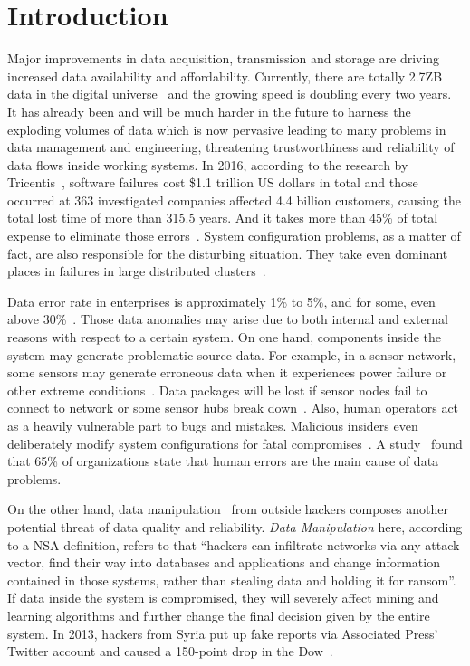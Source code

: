 \documentclass[10pt,conference,letterpaper]{IEEEtran}
\begin{document}
	\section{Introduction}
		Major improvements in data acquisition, transmission and storage are driving increased data availability and affordability. Currently, there are totally 2.7ZB data in the digital universe~\cite{bigDataStatistics} and the growing speed is doubling every two years.
		It has already been and will be much harder in the future to harness the exploding volumes of data which is now pervasive leading to many problems in data management and engineering, threatening trustworthiness and reliability of data flows inside working systems.
		In 2016, according to the research by Tricentis~\cite{softwareFailure}, software failures cost \$1.1 trillion US dollars in total and those occurred at 363 investigated companies affected 4.4 billion customers, causing the total lost time of more than 315.5 years. And it takes more than 45\% of total expense to eliminate those errors~\cite{pawar2016software}. System configuration problems, as a matter of fact, are also responsible for the disturbing situation. They take even dominant places in failures in large distributed clusters~\cite{xu2015systems}.
		
		Data error rate in enterprises is approximately 1\% to 5\%, and for some, even above 30\%~\cite{saha2014data}. Those data anomalies may arise due to both internal and external reasons with respect to a certain system. On one hand, components inside the system may generate problematic source data. For example, in a sensor network, some sensors may generate erroneous data when it experiences power failure or other extreme conditions~\cite{rassam2014adaptive}. Data packages will be lost if sensor nodes fail to connect to network or some sensor hubs break down~\cite{herodotou2014scalable}. Also, human operators act as a heavily vulnerable part to bugs and mistakes. Malicious insiders even deliberately modify system configurations for fatal compromises~\cite{schuster2015vc3}. A study~\cite{humanError} found that 65\% of organizations state that human errors are the main  cause of data problems.
		
		On the other hand, data manipulation~\cite{dataManipulation} from outside hackers composes another potential threat of data quality and reliability. \textit{Data Manipulation} here, according to a NSA definition, refers to that ``hackers can infiltrate networks via any attack vector, find their way into databases and applications and change information contained in those systems, rather than stealing data and holding it for ransom''.
		If data inside the system is compromised, they will severely affect mining and learning algorithms and further change the final decision given by the entire system. In 2013, hackers from Syria put up fake reports via Associated Press' Twitter account and caused a 150-point drop in the Dow~\cite{SyriaHacker}.
		
\end{document}
